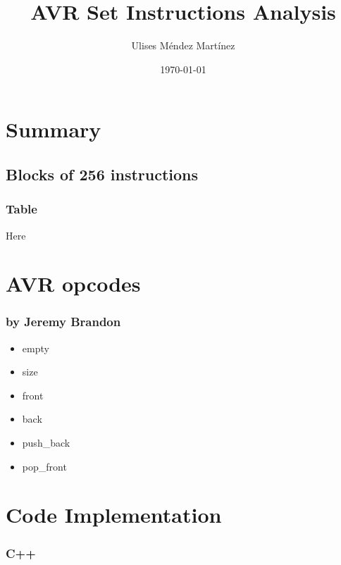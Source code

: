 \documentclass{beamer}
\title[AVR Set Instructions Analysis]{AVR Set Instructions Analysis} %
\author{Ulises M\'endez Mart\'{i}nez} %
\institute[UAG] %
{
Universidad Aut\'onoma de Guadalajara  \\ %
\medskip
\textit{ulisesmdzmtz@gmail.com} %
}
\date{\today} %
\begin{document}
\begin{frame}
\titlepage %
\end{frame}



\section{Summary} 
\subsection{Blocks of 256 instructions}
\begin{frame}
\frametitle{Table}
Here
\end{frame}

\section{AVR opcodes}

\begin{frame}
\frametitle{by Jeremy Brandon}

\begin{multicols}{2}
\begin{itemize}
	\item empty
	\item size
	\item front
	\item back
	\item push\_back
	\item pop\_front
\end{itemize}
\end{multicols}

\end{frame}
\section{Code Implementation}
\begin{frame}
\frametitle{C++}

\end{frame}
\end{document}

